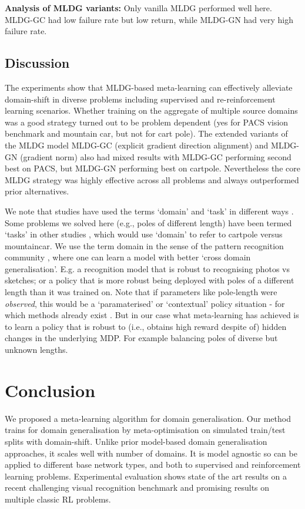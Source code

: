 \documentclass[letterpaper]{article} \usepackage{aaai18}  \usepackage{times}  \usepackage{helvet}  \usepackage{courier}  \usepackage{url}  \usepackage{graphicx}  \usepackage{amsmath}
\newcommand{\keypoint}[1]{\vspace{0.1cm}\noindent\textbf{#1}\quad}
\begin{document}
{\keypoint{Analysis of MLDG variants:} Only vanilla MLDG performed well here. MLDG-GC had low failure rate but low return, while MLDG-GN had very high failure rate. 

\subsection{Discussion}
The experiments show that MLDG-based meta-learning can effectively alleviate domain-shift in diverse problems including supervised and re-reinforcement learning scenarios. Whether training on the aggregate of multiple source domains was a good strategy turned out to be problem dependent (yes for PACS vision benchmark and mountain car, but not for cart pole). The extended variants of the MLDG model MLDG-GC (explicit gradient direction alignment) and MLDG-GN (gradient norm) also had mixed results with MLDG-GC performing second best on PACS, but MLDG-GN performing best on cartpole. Nevertheless the core MLDG strategy was highly effective across all problems and always outperformed prior alternatives. 

We note that studies have used the terms `domain' and `task' in different ways \cite{ammar2015crossDomainTransfer,csurka2017domainAdaptationBook}. Some problems we solved here (e.g., poles of different length) have been termed `tasks' in other studies \cite{ammar2014pgella,ammar2015crossDomainTransfer}, which would use `domain' to refer to cartpole versus mountaincar. We use the term domain in the sense of the pattern recognition community \cite{csurka2017domainAdaptationBook}, where one can learn a model with better `cross domain generalisation'. E.g. a recognition model that is robust to recognising photos vs sketches; or a policy that is more robust being deployed with poles of a different length than it was trained on. Note that if parameters like pole-length were \emph{observed}, this would be a `paramaterised' or `contextual' policy situation - for which methods already exist \cite{kupcsik2013optionGeneralization}. But in our case what meta-learning has achieved is to learn a policy that is robust to (i.e., obtains high reward despite of) hidden changes in the underlying MDP. For example balancing poles of diverse but unknown lengths.

\section{Conclusion}

We proposed a meta-learning algorithm for domain generalisation. Our method trains for domain generalisation by meta-optimisation on simulated train/test splits with domain-shift. Unlike prior model-based domain generalisation approaches, it scales well with number of domains. It is model agnostic so can be applied to different base network types, and both to supervised and reinforcement learning problems. Experimental evaluation shows state of the art results on a recent challenging visual recognition benchmark and promising results on multiple classic RL problems. 

}
\end{document}
